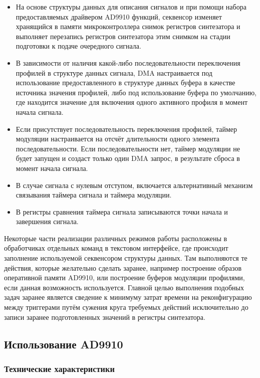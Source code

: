\documentclass[rusmathsym, eqnumwithinsec, amspack, hyperref]{bomgost}
\begin{document}
\begin{itemize}
	\item На основе структуры данных для описания сигналов и при помощи набора предоставляемых драйвером AD9910 функций, секвенсор изменяет хранящийся в памяти микроконтроллера снимок регистров синтезатора и выполняет перезапись регистров синтезатора этим снимком на стадии подготовки к подаче очередного сигнала.
	\item В зависимости от наличия какой-либо последовательности переключения профилей в структуре данных сигнала, DMA настраивается под использование предоставленного в структуре данных буфера в качестве источника значения профилей, либо под использование буфера по умолчанию, где находится значение для включения одного активного профиля в момент начала сигнала.
	\item Если присутствует последовательность переключения профилей, таймер модуляции настраивается на отсчёт длительности одного элемента последовательности. Если последовательности нет, таймер модуляции не будет запущен и создаст только один DMA запрос, в результате сброса в момент начала сигнала.
	\item В случае сигнала с нулевым отступом, включается альтернативный механизм связывания таймера сигнала и таймера модуляции. 
	\item В регистры сравнения таймера сигнала записываются точки начала и завершения сигнала.
\end{itemize}

Некоторые части реализации различных режимов работы расположены в обработчиках отдельных команд в текстовом интерфейсе, где происходит заполнение используемой секвенсором структуры данных. Там выполняются те действия, которые желательно сделать заранее, например построение образов оперативной памяти AD9910, или построение буферов модуляции профилями, если данная возможность используется. Главной целью выполнения подобных задач заранее является сведение к минимуму затрат времени на реконфигурацию между триггерами путём сужения круга требуемых действий исключительно до записи заранее подготовленных значений в регистры синтезатора.

\subsection{Использование AD9910}

\subsubsection{Технические характеристики}
\end{document}
